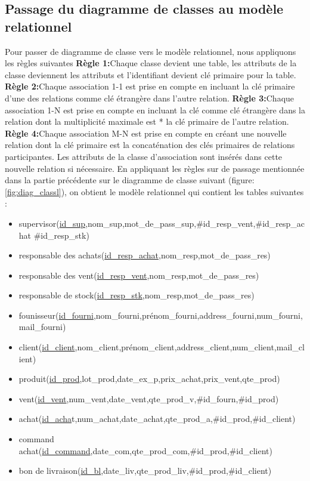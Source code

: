 \documentclass[edit,12pt,a4paper,ChapStyle,oneside,doubleinterligne]{report}
\begin{document}
\subsection{Passage du diagramme de classes au modèle relationnel }
Pour passer de diagramme de classe vers le modèle relationnel, nous appliquons les règles suivantes
\newline
\textbf{Règle 1:}Chaque classe devient une table, les attributs de la classe deviennent
les attributs et l’identifiant devient clé primaire pour la table.
\newline
\textbf{Règle 2:}Chaque association 1-1 est prise en compte en incluant la clé primaire
d’une des relations comme clé étrangère dans l’autre relation.
\newline
\textbf{Règle 3:}Chaque association 1-N est prise en compte en incluant la clé comme
clé étrangère dans la relation dont la multiplicité maximale est * la clé primaire
de l’autre relation.
\newline
\textbf{Règle 4:}Chaque association M-N est prise en compte en créant une nouvelle
relation dont la clé primaire est la concaténation des clés primaires de relations
participantes. Les attributs de la classe d’association sont insérés dans cette nouvelle relation si nécessaire.
\newline \phantom{hassane} \newline
En appliquant les règles sur de passage mentionnée dans la partie précédente sur le diagramme de classe suivant (figure: \ref{fig:diag_classl}), on obtient le modèle relationnel qui contient les tables suivantes :
\begin{itemize}
    \item supervisor(\underline{id\_sup},nom\_sup,mot\_de\_pass\_sup,\#id\_resp\_vent,\#id\_resp\_achat \#id\_resp\_stk)
    \item responsable des achats(\underline{id\_resp\_achat},nom\_resp,mot\_de\_pass\_res)
    \item responsable des vent(\underline{id\_resp\_vent},nom\_resp,mot\_de\_pass\_res)
    \item responsable de stock(\underline{id\_resp\_stk},nom\_resp,mot\_de\_pass\_res)
    \item founisseur(\underline{id\_fourni},nom\_fourni,prénom\_fourni,address\_fourni,num\_fourni,mail\_fourni)
    \item client(\underline{id\_client},nom\_client,prénom\_client,address\_client,num\_client,mail\_client)
    \item produit(\underline{id\_prod},lot\_prod,date\_ex\_p,prix\_achat,prix\_vent,qte\_prod)
    \item vent(\underline{id\_vent},num\_vent,date\_vent,qte\_prod\_v,\#id\_fourn,\#id\_prod)
    \item achat(\underline{id\_acha}t,num\_achat,date\_achat,qte\_prod\_a,\#id\_prod,\#id\_client)
    \item command achat(\underline{id\_command},date\_com,qte\_prod\_com,\#id\_prod,\#id\_client)
    \item bon de livraison(\underline{id\_bl},date\_liv,qte\_prod\_liv,\#id\_prod,\#id\_client)
    
\end{itemize}
\end{document}
